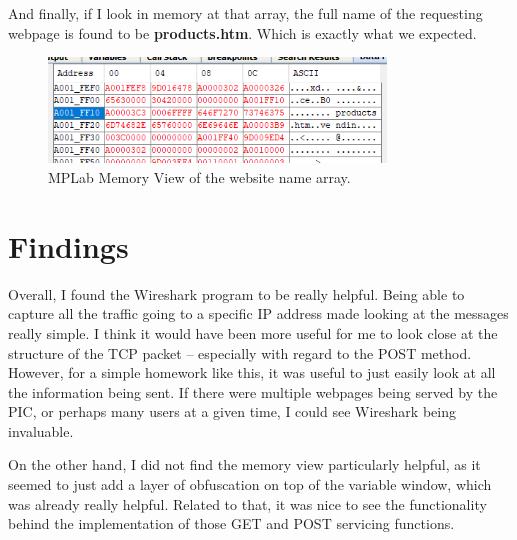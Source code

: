 \documentclass[a4paper, 12pt]{article}
\begin{document}
And finally, if I look in memory at that array, the full name of the requesting webpage is found to be \textbf{products.htm}. Which is exactly what we expected.

\begin{figure}[H]
\centering
\includegraphics[width=0.8\textwidth]{img-post-memory.PNG}
\caption{MPLab Memory View of the website name array.}
\label{fig:img-post-memory}
\end{figure}

\section{Findings}
Overall, I found the Wireshark program to be really helpful. Being able to capture all the traffic going to a specific IP address made looking at the messages really simple. I think it would have been more useful for me to look close at the structure of the TCP packet -- especially with regard to the POST method. However, for a simple homework like this, it was useful to just easily look at all the information being sent. If there were multiple webpages being served by the PIC, or perhaps many users at a given time, I could see Wireshark being invaluable.

On the other hand, I did not find the memory view particularly helpful, as it seemed to just add a layer of obfuscation on top of the variable window, which was already really helpful. Related to that, it was nice to see the functionality behind the implementation of those GET and POST servicing functions.
\end{document}
